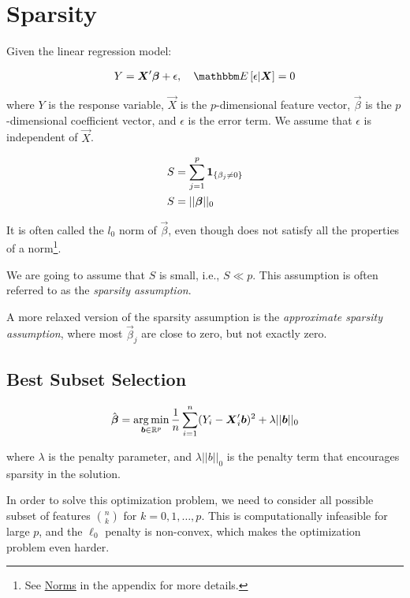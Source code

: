 \section{Sparsity}

Given the linear regression model: 

\begin{align*}
    Y = \Vec{X}'\Vec{\beta} + \epsilon, \quad \E{\epsilon | \Vec{X}} = 0 
\end{align*}

where $Y$ is the response variable, $\Vec{X}$ is the $p$-dimensional feature vector, $\Vec{\beta}$ is the $p$-dimensional coefficient vector, and $\epsilon$ is the error term. We assume that $\epsilon$ is independent of $\Vec{X}$.

\begin{def*}
\begin{align*}
S &= \sum_{j=1}^p \boldsymbol{1}_{\{\beta_j \neq 0\}} \\
S &= ||\boldsymbol{\beta}||_0
\end{align*}

It is often called the $l_0$ norm of $\Vec{\beta}$, even though does not satisfy all the properties of a norm\footnote{See \hyperref[sec:norms]{Norms} in the appendix for more details.}.
\end{def*}

\begin{myanswerbox}
We are going to assume that $S$ is small, i.e., $S \ll p$. This assumption is often referred to as the \textit{sparsity assumption}.
\end{myanswerbox}

A more relaxed version of the sparsity assumption is the \emph{approximate sparsity assumption}, where most $\Vec{\beta}_j$ are close to zero, but not exactly zero.

\subsection{Best Subset Selection}

\begin{align*}
\hat{\boldsymbol{\beta}} = \operatorname*{arg\,min}_{\boldsymbol{b} \in \mathbb{R}^p} 
\frac{1}{n} \sum_{i=1}^n (Y_i - \boldsymbol{X}_i'\boldsymbol{b})^2 + \lambda ||\boldsymbol{b}||_0
\end{align*}

where $\lambda$ is the penalty parameter, and $\lambda ||b||_0$ is the penalty term that encourages sparsity in the solution.

In order to solve this optimization problem, we need to consider all possible subset of features $n \choose k$ for $k = 0, 1, \ldots, p$. This is computationally infeasible for large $p$, and the $\ell_0$ penalty is non-convex, which makes the optimization problem even harder.

